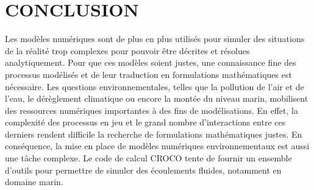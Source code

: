 \documentclass[10pt,a4paper,titlepage]{article}
\begin{document}

\newpage

\section{CONCLUSION}
\label{sec:conclusion}


Les modèles numériques sont de plus en plus utilisés pour simuler des situations de la réalité trop complexes pour pouvoir être décrites et résolues analytiquement.
Pour que ces modèles soient justes, une connaissance fine des processus modélisés et de leur traduction en formulations mathématiques est nécessaire.
Les questions environnementales, telles que la pollution de l’air et de l’eau, le dérèglement climatique ou encore la montée du niveau marin, mobilisent des ressources numériques importantes à des fins de modélisations.
En effet, la complexité des processus en jeu et le grand nombre d’interactions entre ces derniers rendent difficile la recherche de formulations mathématiques justes.
En conséquence, la mise en place de modèles numériques environnementaux est aussi une tâche complexe.
Le code de calcul CROCO tente de fournir un ensemble d’outils pour permettre de simuler des écoulements fluides, notamment en domaine marin.
\end{document}
